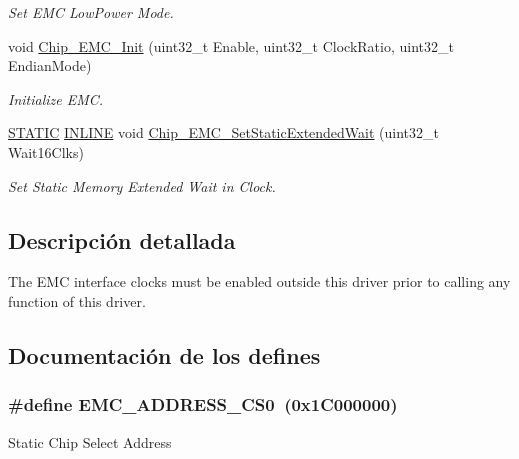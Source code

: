 \begin{DoxyCompactItemize}
\begin{DoxyCompactList}\small\item\em Set E\+MC Low\+Power Mode. \end{DoxyCompactList}\item 
void \hyperlink{group___e_m_c__18_x_x__43_x_x_ga96af5cbd177432e40c687097f5453480}{Chip\+\_\+\+E\+M\+C\+\_\+\+Init} (uint32\+\_\+t Enable, uint32\+\_\+t Clock\+Ratio, uint32\+\_\+t Endian\+Mode)
\begin{DoxyCompactList}\small\item\em Initialize E\+MC. \end{DoxyCompactList}\item 
\hyperlink{group___l_p_c___types___public___macros_ga10b2d890d871e1489bb02b7e70d9bdfb}{S\+T\+A\+T\+IC} \hyperlink{spifi__18xx__43xx_8h_a2eb6f9e0395b47b8d5e3eeae4fe0c116}{I\+N\+L\+I\+NE} void \hyperlink{group___e_m_c__18_x_x__43_x_x_ga6584bd99794783f75a176b8ee3b2cbc9}{Chip\+\_\+\+E\+M\+C\+\_\+\+Set\+Static\+Extended\+Wait} (uint32\+\_\+t Wait16\+Clks)
\begin{DoxyCompactList}\small\item\em Set Static Memory Extended Wait in Clock. \end{DoxyCompactList}\end{DoxyCompactItemize}


\subsection{Descripción detallada}
The E\+MC interface clocks must be enabled outside this driver prior to calling any function of this driver. 

\subsection{Documentación de los \textquotesingle{}defines\textquotesingle{}}
\subsubsection[{\texorpdfstring{E\+M\+C\+\_\+\+A\+D\+D\+R\+E\+S\+S\+\_\+\+C\+S0}{EMC_ADDRESS_CS0}}]{\setlength{\rightskip}{0pt plus 5cm}\#define E\+M\+C\+\_\+\+A\+D\+D\+R\+E\+S\+S\+\_\+\+C\+S0~(0x1\+C000000)}\hypertarget{group___e_m_c__18_x_x__43_x_x_ga128f03ce6dd1a7f821d0ab1a53e11ac4}{}\label{group___e_m_c__18_x_x__43_x_x_ga128f03ce6dd1a7f821d0ab1a53e11ac4}
Static Chip Select Address 

